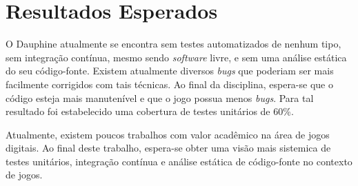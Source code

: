 \chapter[Resultados Esperados]{Resultados Esperados}

O Dauphine atualmente se encontra sem testes automatizados de nenhum tipo, sem integração contínua, mesmo sendo \textit{software} livre, e sem uma análise estática do seu código-fonte. Existem atualmente diversos \textit{bugs} que poderiam ser mais facilmente corrigidos com tais técnicas. Ao final da disciplina, espera-se que o código esteja mais manutenível e que o jogo possua menos \textit{bugs}. Para tal resultado foi estabelecido uma cobertura de testes unitários de 60\%.

Atualmente, existem poucos trabalhos com valor acadêmico na área de jogos digitais. Ao final deste trabalho, espera-se obter uma visão mais sistemica de testes unitários, integração contínua e análise estática de código-fonte no contexto de jogos.
